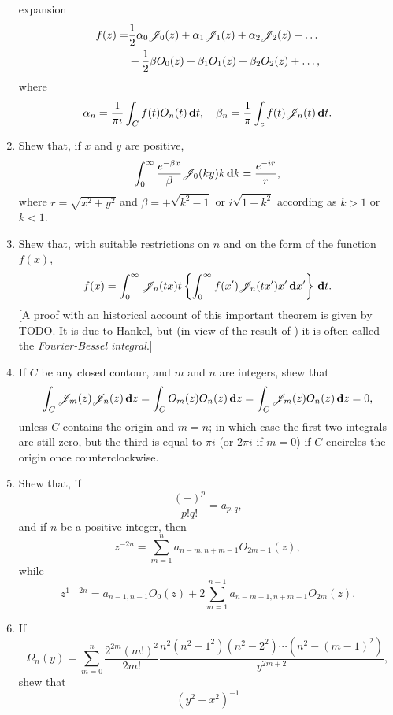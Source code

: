 \documentclass{book}
\begin{document}
\begin{enumerate}
  expansion
  \begin{align*}
    f(z)
    =&
    \frac{1}{2} \alpha_{0} \mathscr{J}_{0}(z) + \alpha_{1} \mathscr{J}_{1}(z)
    + \alpha_{2} \mathscr{J}_{2}(z) + \dots
    \\
    &
    + \frac{1}{2} \beta O_{0}(z) + \beta_{1} O_{1}(z) + \beta_{2} O_{2}(z) + \dots,
  \end{align*}
  where
  $$
  \alpha_{n}
  =
  \frac{1}{\pi i}
  \int_{C} f(t) O_{n}(t) \, \mathbf{d} t,
  \quad
  \beta_{n}
  =
  \frac{1}{\pi}
  \int_{c} f(t) \mathscr{J}_{n}(t) \, \mathbf{d} t.
  $$
\item
  Shew that, if $x$ and $y$ are positive,
  $$
  \int_{0}^{\infty}
  \frac{e^{-\beta x}}{\beta}
  \mathscr{J}_{0}(ky)
  k \, \mathbf{d} k
  =
  \frac{e^{-ir}}{r},
  $$
  where $r = \sqrt{x^{2}+y^{2}}$ and
  $\beta = +\sqrt{k^{2} - 1}$
  or
  $i \sqrt{1 - k^{2}}$
  according as $k>1$ or $k<1$.
\item
  Shew that, with suitable restrictions on $n$ and on the form of the
  function $f(x)$,
  $$
  f(x)
  =
  \int_{0}^{\infty} \mathscr{J}_{n}(tx) t
  \left\{ 
    \int_{0}^{\infty}
    f(x') \mathscr{J}_{n}(tx') x' \, \mathbf{d} x'
   \right\}
  \, \mathbf{d} t.
  $$
  [A proof with an historical account of this important theorem is
  given by TODO. It is due to Hankel, but (in view of the result of
  ) it is often called the \emph{Fourier-Bessel
    integral}.]
\item
  If $C$ be any closed contour, and $m$ and $n$ are integers, shew
  that
  $$
  \int_{C} \mathscr{J}_{m}(z) \mathscr{J}_{n}(z) \, \mathbf{d} z
  =
  \int_{C} O_{m}(z) O_{n}(z) \, \mathbf{d} z
  =
  \int_{C} \mathscr{J}_{m}(z) O_{n}(z) \, \mathbf{d} z
  =
  0,
  $$
  unless $C$ contains the origin and $m=n$; in which case the first
  two integrals are still zero, but the third is equal to $\pi i$ (or
  $2\pi i$ if $m=0$) if $C$ encircles the origin once
  counterclockwise.
\item
  Shew that, if
  $$
  \frac{(-)^{p}}{p!q!} = a_{p,q},
  $$
  and if $n$ be a positive integer, then
  $$
  z^{-2n}
  =
  \sum_{m=1}^{n} a_{n-m,n+m-1} O_{2m-1}(z),
  $$
  while
  $$
  z^{1-2n}
  =
  a_{n-1,n-1} O_{0}(z)
  +
  2 \sum_{m=1}^{n-1} a_{n-m-1,n+m-1} O_{2m}(z).
  $$
\item
  If
  $$
  \Omega_{n}(y)
  =
  \sum_{m=0}^{n}
  \frac{2^{2m} (m!)^{2}}{2m!}
  \frac{n^{2} (n^{2}-1^{2}) (n^{2}-2^{2}) \cdots (n^{2}-(m-1)^{2})}{y^{2m+2}},
  $$
  shew that
  $$
  (y^{2}-x^{2})^{-1}
$$
\end{enumerate}
\end{document}
